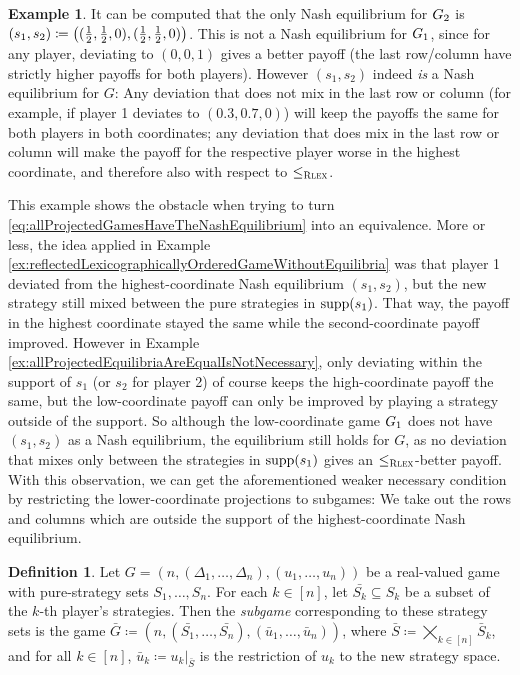 \documentclass[a4paper,DIV=11]{scrreprt}
\theoremstyle{definition}
\newtheorem{defn}[thm]{Definition} %
\newtheorem{ex}[thm]{Example} %
\begin{document}
\begin{ex}
        It can be computed that the only Nash equilibrium for $G_{2}$ is $(s_1, s_2) \coloneqq \bigl((\frac{1}{2}, \frac{1}{2}, 0), (\frac{1}{2}, \frac{1}{2}, 0)\bigr)$.
        This is not a Nash equilibrium for $G_{1}$, since for any player, deviating to $(0, 0, 1)$ gives a better payoff (the last row/column have strictly higher payoffs for both players).
        However $(s_1, s_2)$ indeed \emph{is} a Nash equilibrium for $G$:
        Any deviation that does not mix in the last row or column (for example, if player 1 deviates to $(0.3, 0.7, 0)$) will keep the payoffs the same for both players in both coordinates; any deviation that does mix in the last row or column will make the payoff for the respective player worse in the highest coordinate, and therefore also with respect to $\leq_{\textsc{Rlex}}$.
    \end{ex}

    This example shows the obstacle when trying to turn \eqref{eq:allProjectedGamesHaveTheNashEquilibrium} into an equivalence.
    More or less, the idea applied in Example \ref{ex:reflectedLexicographicallyOrderedGameWithoutEquilibria} was that player 1 deviated from the highest-coordinate Nash equilibrium $(s_1, s_2)$, but the new strategy still mixed between the pure strategies in $\operatorname{supp}(s_1)$. That way, the payoff in the highest coordinate stayed the same while the second-coordinate payoff improved.
    However in Example \ref{ex:allProjectedEquilibriaAreEqualIsNotNecessary}, only deviating within the support of $s_1$ (or $s_2$ for player 2) of course keeps the high-coordinate payoff the same, but the low-coordinate payoff can only be improved by playing a strategy outside of the support.
    So although the low-coordinate game $G_{1}$ does not have $(s_1, s_2)$ as a Nash equilibrium, the equilibrium still holds for $G$, as no deviation that mixes only between the strategies in $\operatorname{supp}(s_1)$ gives an $\leq_{\textsc{Rlex}}$-better payoff.
    With this observation, we can get the aforementioned weaker necessary condition by restricting the lower-coordinate projections to subgames: We take out the rows and columns which are outside the support of the highest-coordinate Nash equilibrium.
    
    \begin{defn}
        Let $G = (n, (\Delta_1, \dots, \Delta_n), (u_1, \dots, u_n))$ be a real-valued game with pure-strategy sets $S_1, \dots, S_n$. For each $k \in [n]$, let $\bar{S_k} \subseteq S_k$ be a subset of the $k$-th player's strategies. Then the \emph{subgame} corresponding to these strategy sets is the game $\bar{G} \coloneqq (n, (\bar{S_1}, \dots, \bar{S_n}), (\bar{u}_1, \dots, \bar{u}_n))$, where $\bar{S} \coloneqq \bigtimes_{k \in [n]} \bar{S}_k$, and for all $k \in [n]$, $\bar{u}_k \coloneqq u_k\vert_{\bar{S}}$ is the restriction of $u_k$ to the new strategy space.
    \end{defn}
\end{document}
